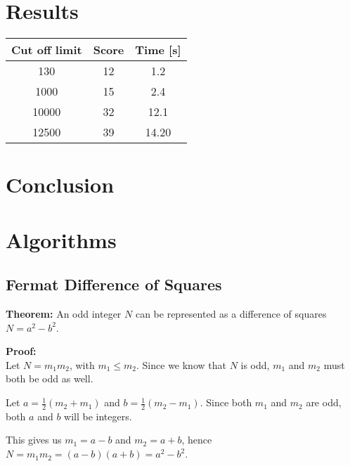 \documentclass[a4paper, 12pt]{report}
\begin{document}
\chapter{Results}

\begin{tabular} {c c c}
Cut off limit 	&	 Score 	& Time [s] \\ \hline
130		&	12		& 1.2 \\
1000	&	15		& 2.4 \\
10000 	& 	32		& 12.1 \\
12500	&	39		&14.20 \\

\end{tabular}
\chapter{Conclusion}
\appendix
\chapter{Algorithms}
\section{Fermat Difference of Squares}
\label{sec:fermatproof}
\begin{description}
\item{\bf Theorem:} An odd integer $N$ can be represented as a difference of squares $N = a^2 - b^2$.


\item{\bf Proof:} \\
Let $ N = m_1m_2 $, with $ m_1 \le m_2 $. Since we know that $N$ is odd, $m_1$ and $m_2$ must both be odd as well.

Let $ a = \frac{1}{2} (m_2 + m_1) $ and $ b = \frac{1}{2} (m_2 - m_1) $. Since both $m_1$ and $m_2$ are odd, both $a$ and $b$ will be integers. 

This gives us $m_1 = a - b$ and $m_2 = a + b $, hence $N = m_1m_2 = (a - b)(a + b) = a^2 - b^2$.

\end{description}
\end{document}
